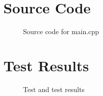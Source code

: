 \documentclass[12pt]{article}
\begin{document}
\maketitle
\pagebreak


\section{Source Code}

\begin{figure}[h]
    
    \caption{Source code for \textsf{main.cpp}}
    \label{fig:source}
\end{figure}


\newpage



\section{Test Results}

\begin{figure}[h]
    
    \caption{Test and test results}
    \label{fig:results}
\end{figure}
\end{document}
